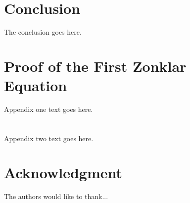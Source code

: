 \documentclass[journal]{IEEEtran}
\begin{document}
\section{Conclusion}
The conclusion goes here.






%


\appendices
\section{Proof of the First Zonklar Equation}
Appendix one text goes here.

\section{}
Appendix two text goes here.


\section*{Acknowledgment}


The authors would like to thank...
\end{document}
